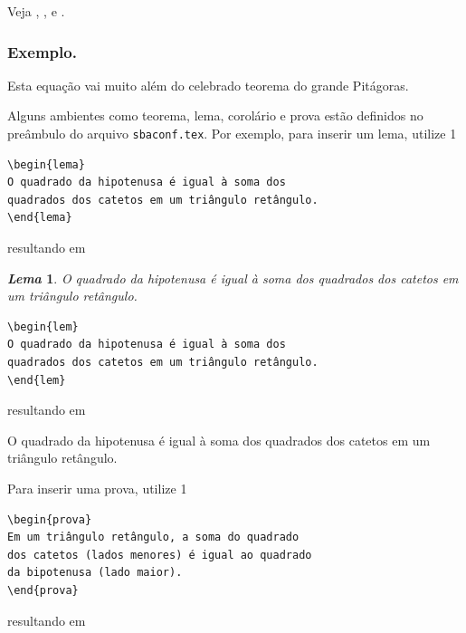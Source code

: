 \documentclass[a4paper]{ifacconf}
\def\portugues{1}
\def\portugues{0}
\newtheorem{lema}[thm]{{\em Lema}}{ }
\newenvironment{prova}{{\bf Prova.}}{ }
\begin{document}

Veja \cite{Abl:56}, \cite{AbTaRu:54}, \cite{Keo:58} e \cite{Pow:85}. 

\subsubsection{Exemplo.} 

Esta equação vai muito além do celebrado teorema do grande Pitágoras.

Alguns ambientes como teorema, lema, corolário e prova estão definidos no preâmbulo 
do arquivo {\tt sbaconf.tex}. Por exemplo, para inserir um lema, utilize
\if\portugues1
\begin{verbatim}
\begin{lema}
O quadrado da hipotenusa é igual à soma dos 
quadrados dos catetos em um triângulo retângulo.
\end{lema}
\end{verbatim}
resultando em
\begin{lema}   %
	O quadrado da hipotenusa é igual à soma dos quadrados dos catetos em um triângulo retângulo. 
\end{lema}
\else
\begin{verbatim}
\begin{lem}
O quadrado da hipotenusa é igual à soma dos 
quadrados dos catetos em um triângulo retângulo.
\end{lem}
\end{verbatim}
resultando em
\begin{lem}   %
	O quadrado da hipotenusa é igual à soma dos quadrados dos catetos em um triângulo retângulo. 
\end{lem}
\fi

Para inserir uma prova, utilize
\if\portugues1
\begin{verbatim}
\begin{prova}
Em um triângulo retângulo, a soma do quadrado 
dos catetos (lados menores) é igual ao quadrado 
da bipotenusa (lado maior). 
\end{prova}
\end{verbatim}
resultando em
\end{document}
